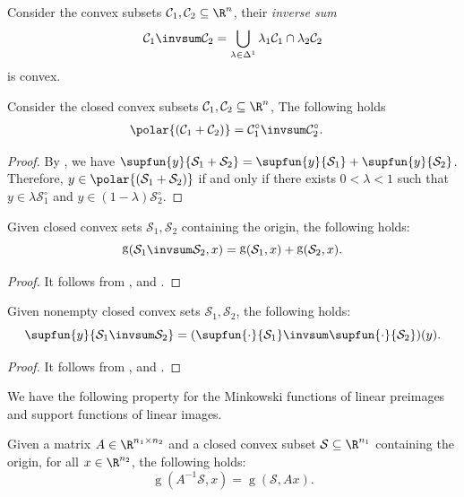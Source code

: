 \documentclass[11pt,twoside,a4paper,openright]{uclouvain-thesis}
\newcommand{\Cset}{\mathcal{C}}
\DeclareMathOperator{\gauge}{g}
\begin{document}
\begin{myprop}
  Consider the convex subsets $\Cset_1, \Cset_2 \subseteq \R^n$,
  their \emph{inverse sum}
  \[ \Cset_1 \invsum \Cset_2 = \bigcup_{\lambda \in \Delta^1} \lambda_1 \Cset_1 \cap \lambda_2 \Cset_2 \]
  is convex.
\end{myprop}

\begin{myprop} %
  \label{prop:suminvsum}
  Consider the closed convex subsets $\Cset_1, \Cset_2 \subseteq \R^n$,
  The following holds
  \begin{align*}
    \polar{(\Cset_1 + \Cset_2)} & = \Cset_1^\circ \invsum \Cset_2^\circ.
  \end{align*}
  \begin{proof}
    By ,
    we have
    $\supfun{y}{\mathcal{S}_1 + \mathcal{S}_2} = \supfun{y}{\mathcal{S}_1} + \supfun{y}{\mathcal{S}_2}$.
    Therefore, $y \in \polar{(\mathcal{S}_1 + \mathcal{S}_2)}$ if and only if
    there exists $0 < \lambda < 1$ such that
    $y \in \lambda \mathcal{S}_1^\circ$ and $y \in (1 - \lambda) \mathcal{S}_2^\circ$.
  \end{proof}
\end{myprop}

\begin{myprop}
  \label{prop:gaugeinvsum}
  Given closed convex sets $\mathcal{S}_1, \mathcal{S}_2$ containing the origin,
  the following holds:
  \[
    \gauge(\mathcal{S}_1 \invsum \mathcal{S}_2, x) = \gauge(\mathcal{S}_1, x) + \gauge(\mathcal{S}_2, x).
  \]
  \begin{proof}
    It follows from ,  and .
  \end{proof}
\end{myprop}

\begin{myprop}
  \label{prop:supportinvsum}
  Given nonempty closed convex sets $\mathcal{S}_1, \mathcal{S}_2$,
  the following holds:
  \[
    \supfun{y}{\mathcal{S}_1 \invsum \mathcal{S}_2} = (\supfun{\cdot}{\mathcal{S}_1} \invsum \supfun{\cdot}{\mathcal{S}_2})(y).
  \]
  \begin{proof}
    It follows from ,  and .
  \end{proof}
\end{myprop}

We have the following property for the Minkowski functions of linear preimages and support functions of linear images.
\begin{myprop}
  \label{prop:gA}
  Given a matrix $A \in \R^{n_1 \times n_2}$ and a closed convex subset $\mathcal{S} \subseteq \R^{n_1}$ containing the origin,
  for all $x \in \R^{n_2}$,
  the following holds:
  \begin{equation}
    \label{eq:gA}
    \gauge(A^{-1}\mathcal{S}, x) = \gauge(\mathcal{S}, Ax).
  \end{equation}
\end{myprop}
\end{document}

